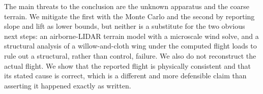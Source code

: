 The main threats to the conclusion are the unknown apparatus and the coarse terrain.
We mitigate the first with the Monte Carlo and the second by reporting slope and
lift as lower bounds, but neither is a substitute for the two obvious next steps: an
airborne-LIDAR terrain model with a microscale wind solve, and a structural analysis
of a willow-and-cloth wing under the computed flight loads to rule out a structural,
rather than control, failure.
We also do not reconstruct the actual flight.
We show that the reported flight is physically consistent and that its stated cause
is correct, which is a different and more defensible claim than asserting it happened
exactly as written.
